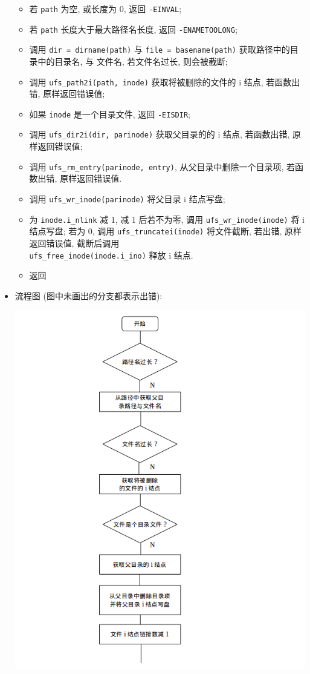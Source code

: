 \documentclass[nofonts, titlepage]{ctexart}
\begin{document}
\begin{itemize}
  \begin{itemize}
  \item
    若 \texttt{path} 为空, 或长度为 0, 返回 \texttt{-EINVAL};
  \item
    若 \texttt{path} 长度大于最大路径名长度, 返回
    \texttt{-ENAMETOOLONG};
  \item
    调用 \texttt{dir = dirname(path)} 与 \texttt{file = basename(path)}
    获取路径中的目录中的目录名, 与 文件名, 若文件名过长, 则会被截断;
  \item
    调用 \texttt{ufs\_path2i(path, inode)} 获取将被删除的文件的 i 结点,
    若函数出错, 原样返回错误值;
  \item
    如果 \texttt{inode} 是一个目录文件, 返回 \texttt{-EISDIR};
  \item
    调用 \texttt{ufs\_dir2i(dir, parinode)} 获取父目录的的 i 结点,
    若函数出错, 原样返回错误值;
  \item
    调用 \texttt{ufs\_rm\_entry(parinode, entry)},
    从父目录中删除一个目录项, 若函数出错, 原样返回错误值.
  \item
    调用 \texttt{ufs\_wr\_inode(parinode)} 将父目录 i 结点写盘;
  \item
    为 \texttt{inode.i\_nlink} 减 1, 减 1 后若不为零, 调用
    \texttt{ufs\_wr\_inode(inode)} 将 i 结点写盘; 若为 0, 调用
    \texttt{ufs\_truncatei(inode)} 将文件截断, 若出错, 原样返回错误值,
    截断后调用 \\
    \texttt{ufs\_free\_inode(inode.i\_ino)} 释放 i 结点.
  \item
    返回
  \end{itemize}
\item
  流程图
  (图中未画出的分支都表示出错):

  \includegraphics[width=15cm]{./images/./unlink_1.png}


\end{itemize}
\end{document}
